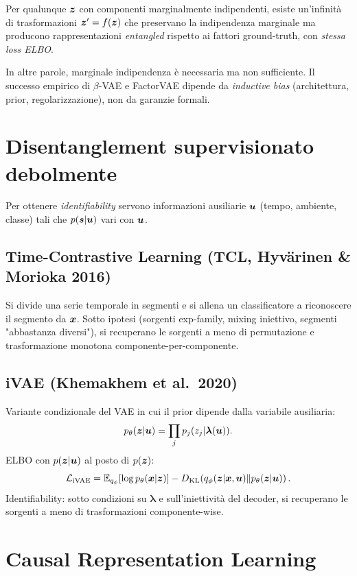 \begin{theorem}
Per qualunque $\bm{z}$ con componenti marginalmente indipendenti, esiste un'infinità di trasformazioni $\bm{z}' = f(\bm{z})$ che preservano la indipendenza marginale ma producono rappresentazioni \emph{entangled} rispetto ai fattori ground-truth, con \emph{stessa loss ELBO}.
\end{theorem}

In altre parole, marginale indipendenza è necessaria ma non sufficiente. Il successo empirico di $\beta$-VAE e FactorVAE dipende da \emph{inductive bias} (architettura, prior, regolarizzazione), non da garanzie formali.

\section{Disentanglement supervisionato debolmente}

Per ottenere \emph{identifiability} servono informazioni ausiliarie $\bm{u}$ (tempo, ambiente, classe) tali che $p(\bm{s}|\bm{u})$ vari con $\bm{u}$.

\subsection{Time-Contrastive Learning (TCL, Hyvärinen \& Morioka 2016)}
Si divide una serie temporale in segmenti e si allena un classificatore a riconoscere il segmento da $\bm{x}$. Sotto ipotesi (sorgenti exp-family, mixing iniettivo, segmenti "abbastanza diversi"), si recuperano le sorgenti a meno di permutazione e trasformazione monotona componente-per-componente.

\subsection{iVAE (Khemakhem et al.\ 2020)}
Variante condizionale del VAE in cui il prior dipende dalla variabile ausiliaria:
\[
p_\theta(\bm{z}|\bm{u}) = \prod_j p_j(z_j | \boldsymbol{\lambda}(\bm{u})).
\]
ELBO con $p(\bm{z}|\bm{u})$ al posto di $p(\bm{z})$:
\[
\mathcal{L}_{\text{iVAE}} = \mathbb{E}_{q_\phi}[\log p_\theta(\bm{x}|\bm{z})] - D_{\mathrm{KL}}\!\left(q_\phi(\bm{z}|\bm{x},\bm{u}) \| p_\theta(\bm{z}|\bm{u})\right).
\]
Identifiability: sotto condizioni su $\boldsymbol{\lambda}$ e sull'iniettività del decoder, si recuperano le sorgenti a meno di trasformazioni componente-wise.

\section{Causal Representation Learning}

